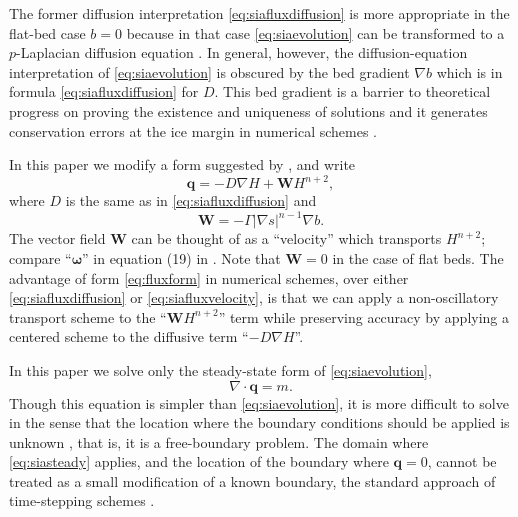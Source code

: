 \documentclass[twocolumn,letterpaper]{igs}
\newcommand\bq{\mathbf{q}}
\newcommand\bW{\mathbf{W}}
\newcommand{\Div}{\nabla\cdot}
\newcommand{\grad}{\nabla}
\begin{document}
The former diffusion interpretation \eqref{eq:siafluxdiffusion} is more appropriate in the flat-bed case $b=0$ because in that case \eqref{eq:siaevolution} can be transformed to a $p$-Laplacian diffusion equation \citep{CDDSV}.  In general, however, the diffusion-equation interpretation of \eqref{eq:siaevolution} is obscured by the bed gradient $\grad b$ which is in formula \eqref{eq:siafluxdiffusion} for $D$.  This bed gradient is a barrier to theoretical progress on proving the existence and uniqueness of solutions \citep{JouvetBueler2012} and it generates conservation errors at the ice margin in numerical schemes \citep{JaroschSchoofAnslow2013}.

In this paper we modify a form suggested by \cite{JaroschSchoofAnslow2013}, and write
\begin{equation}
\bq = - D \grad H + \bW H^{n+2},\label{eq:fluxform}
\end{equation}
where $D$ is the same as in \eqref{eq:siafluxdiffusion} and
\begin{equation}
\bW = - \Gamma |\grad s|^{n-1} \grad b.  \label{eq:siaWdefine}
\end{equation}
The vector field $\bW$ can be thought of as a ``velocity'' which transports $H^{n+2}$; compare ``$\boldsymbol{\omega}$'' in equation (19) in \citep{JaroschSchoofAnslow2013}.  Note that $\bW=0$ in the case of flat beds.  The advantage of form \eqref{eq:fluxform} in numerical schemes, over either \eqref{eq:siafluxdiffusion} or \eqref{eq:siafluxvelocity}, is that we can apply a non-oscillatory transport scheme to the ``$\bW H^{n+2}$'' term while preserving accuracy by applying a centered scheme to the diffusive term ``$-D \grad H$''.

In this paper we solve only the steady-state form of \eqref{eq:siaevolution},
\begin{equation}
\Div \bq = m.  \label{eq:siasteady}
\end{equation}
Though this equation is simpler than \eqref{eq:siaevolution}, it is more difficult to solve in the sense that the location where the boundary conditions should be applied is unknown \citep{JaroschSchoofAnslow2013,JouvetBueler2012}, that is, it is a free-boundary problem.  The domain where \eqref{eq:siasteady} applies, and the location of the boundary where $\bq=0$, cannot be treated as a small modification of a known boundary, the standard approach of time-stepping schemes \citep{Bueleretal2005,Huybrechtsetal1996}.
\end{document}
